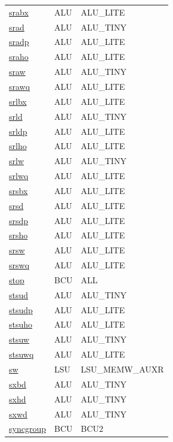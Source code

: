 \begin{small}
\begin{longtable}[l]{l l l}
\hyperlink{lvx.srabx}{srabx} & ALU & ALU\_LITE \\ 
\hyperlink{lvx.srad}{srad} & ALU & ALU\_TINY \\ 
\hyperlink{lvx.sradp}{sradp} & ALU & ALU\_LITE \\ 
\hyperlink{lvx.sraho}{sraho} & ALU & ALU\_LITE \\ 
\hyperlink{lvx.sraw}{sraw} & ALU & ALU\_TINY \\ 
\hyperlink{lvx.srawq}{srawq} & ALU & ALU\_LITE \\ 
\hyperlink{lvx.srlbx}{srlbx} & ALU & ALU\_LITE \\ 
\hyperlink{lvx.srld}{srld} & ALU & ALU\_TINY \\ 
\hyperlink{lvx.srldp}{srldp} & ALU & ALU\_LITE \\ 
\hyperlink{lvx.srlho}{srlho} & ALU & ALU\_LITE \\ 
\hyperlink{lvx.srlw}{srlw} & ALU & ALU\_TINY \\ 
\hyperlink{lvx.srlwq}{srlwq} & ALU & ALU\_LITE \\ 
\hyperlink{lvx.srsbx}{srsbx} & ALU & ALU\_LITE \\ 
\hyperlink{lvx.srsd}{srsd} & ALU & ALU\_LITE \\ 
\hyperlink{lvx.srsdp}{srsdp} & ALU & ALU\_LITE \\ 
\hyperlink{lvx.srsho}{srsho} & ALU & ALU\_LITE \\ 
\hyperlink{lvx.srsw}{srsw} & ALU & ALU\_LITE \\ 
\hyperlink{lvx.srswq}{srswq} & ALU & ALU\_LITE \\ 
\hyperlink{lvx.stop}{stop} & BCU & ALL \\ 
\hyperlink{lvx.stsud}{stsud} & ALU & ALU\_TINY \\ 
\hyperlink{lvx.stsudp}{stsudp} & ALU & ALU\_LITE \\ 
\hyperlink{lvx.stsuho}{stsuho} & ALU & ALU\_LITE \\ 
\hyperlink{lvx.stsuw}{stsuw} & ALU & ALU\_TINY \\ 
\hyperlink{lvx.stsuwq}{stsuwq} & ALU & ALU\_LITE \\ 
\hyperlink{lvx.sw}{sw} & LSU & LSU\_MEMW\_AUXR \\ 
\hyperlink{lvx.sxbd}{sxbd} & ALU & ALU\_TINY \\ 
\hyperlink{lvx.sxhd}{sxhd} & ALU & ALU\_TINY \\ 
\hyperlink{lvx.sxwd}{sxwd} & ALU & ALU\_TINY \\ 
\hyperlink{lvx.syncgroup}{syncgroup} & BCU & BCU2 \\ 

\end{longtable}
\end{small}
